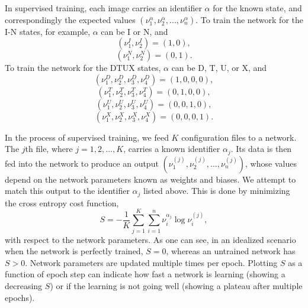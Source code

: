 In supervised training, each image carries an identifier $\alpha$ for the known state, and correspondingly the expected values $(\nu_1^{\alpha}, \nu_2^{\alpha}, ..., \nu_n^{\alpha})$. To train the network for the I-N states, for example, ${\alpha}$ can be I or N, and
\begin{equation}\label{Istate}
(\nu_1^I, \nu_2^I) = (1,0),
\end{equation}
\begin{equation}\label{Nstate}
(\nu_1^N, \nu_2^N) = (0,1).
\end{equation}
To train the network for the DTUX states, $\alpha$ can be D, T, U, or X, and
\begin{equation}\label{Dstate}
(\nu_1^D, \nu_2^D, \nu_3^D, \nu_4^D) = (1,0,0,0),
\end{equation}
\begin{equation}\label{Tstate}
(\nu_1^T, \nu_2^T, \nu_3^T, \nu_4^T) = (0,1,0,0),
\end{equation}
\begin{equation}\label{Ustate}
(\nu_1^U, \nu_2^U, \nu_3^U, \nu_4^U) = (0,0,1,0),
\end{equation}
\begin{equation}\label{Xstate}
(\nu_1^X, \nu_2^X, \nu_3^X, \nu_4^X) = (0,0,0,1).
\end{equation}

In the process of supervised training, we feed $K$ configuration files to a network. The $j$th file, where $j=1,2,...,K$,
carries a known identifier $\alpha_j$.
Its data is then fed into the network to
produce an output $(\nu_1^{(j)}, \nu_2^{(j)}, ..., \nu_n^{(j)})$, whose values depend on the network parameters known as
weights and biases. We attempt to match this output to the identifier $\alpha_j$ listed above. This is done by minimizing
the cross entropy cost function,
\begin{equation}
S = -\frac{1}{K}\sum_{j=1}^K \sum_{i=1}^{n} {\nu}_i^{\alpha_j}\log{\nu_i^{(j)}},
\label{cost}
\end{equation}
with respect to the network parameters. As one can see, in an idealized scenario when the network is perfectly trained, $S=0$, whereas an untrained network has $S > 0$. Network parameters are updated multiple times per epoch.
Plotting $S$ as a function of epoch step can indicate
how fast a network is learning (showing a decreasing $S$) or if the learning is not going well (showing a plateau after multiple epochs).

